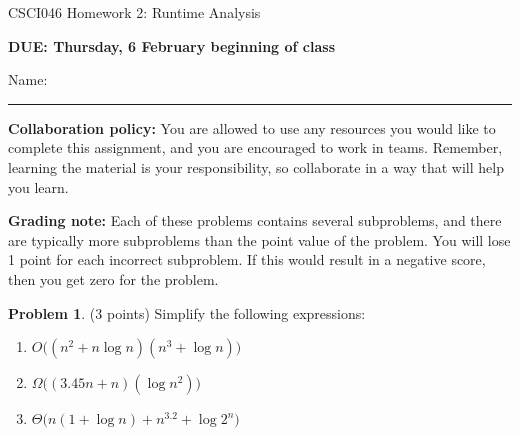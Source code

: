 \documentclass[10pt]{article}
\theoremstyle{definition}
\newtheorem{problem}{Problem}
\begin{document}
\begin{center}
    {
\Large
CSCI046 Homework 2: Runtime Analysis
}


    \vspace{0.1in}
    \textbf{DUE: Thursday, 6 February beginning of class}

    \vspace{0.1in}
\end{center}

\vspace{0.25in}
\noindent
Name: 

\noindent
\rule{\textwidth}{0.1pt}
\vspace{0.15in}

\noindent
\textbf{Collaboration policy:} 
You are allowed to use any resources you would like to complete this assignment,
and you are encouraged to work in teams.
Remember, learning the material is your responsibility,
so collaborate in a way that will help you learn.
\vspace{0.15in}

\noindent
\textbf{Grading note:} 
Each of these problems contains several subproblems,
and there are typically more subproblems than the point value of the problem.
You will lose 1 point for each incorrect subproblem.
If this would result in a negative score, then you get zero for the problem.
\vspace{0.15in}


\begin{problem}
    (3 points)
    Simplify the following expressions:

\begin{enumerate}
    \item $O\bigg((n^2 + n\log n)(n^3 + \log n)\bigg)$
    \vspace{1.5in}
\item $\Omega\bigg((3.45n + n)(\log n^2)\bigg)$
    \vspace{1.5in}
\item $\Theta\bigg(n(1 + \log n) + n^{3.2} + \log 2^n\bigg)$
\end{enumerate}
\end{problem}
\end{document}
